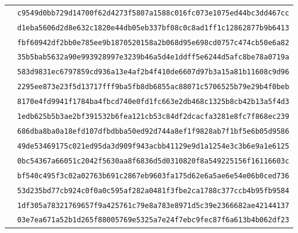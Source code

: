 {\begin{longtable}{L{0.36\textwidth}L{0.58\textwidth}}
 & \texttt{c9549d0bb729d14700f62d4273f5807a}\allowbreak\texttt{1588c016fc073e1075ed44bc3dd467cc}\\
 & \texttt{d1eba5606d2d8e632c1820e44db05eb3}\allowbreak\texttt{37bf08c0c8ad1ff1c12862877b9b6413}\\
 & \texttt{fbf60942df2bb0e785ee9b1870520158}\allowbreak\texttt{a2b068d95e698cd0757c474cb50e6a82}\\
 & \texttt{35b5bab5632a90e993928997e3239b46}\allowbreak\texttt{a5d4e1ddff5e6244d5afc8be78a0719a}\\
 & \texttt{583d9831ec6797859cd936a13e4af2b4}\allowbreak\texttt{f410de6607d97b3a15a81b11608c9d96}\\
 & \texttt{2295ee873e23f5d13717fff9ba5fb8db}\allowbreak\texttt{6855ac88071c5706525b79e29b4f0beb}\\
 & \texttt{8170e4fd9941f1784ba4fbcd740e0fd1}\allowbreak\texttt{fc663e2db468c1325b8cb42b13a5f4d3}\\
 & \texttt{1edb625b5b3ae2bf391532b6fea121cb}\allowbreak\texttt{53c84df2dcacfa3281e8fc7f868ec239}\\
 & \texttt{686dba8ba0a18efd107dfbdbba50ed92}\allowbreak\texttt{d744a8ef1f9828ab7f1bf5e6b05d9586}\\
 & \texttt{49de53469175c021ed95da3d909f943a}\allowbreak\texttt{cbb41129e9d1a1254e3c3b6e9a1e6125}\\
 & \texttt{0bc54367a66051c2042f5630aa8f6836}\allowbreak\texttt{d5d0310820f8a549225156f16116603c}\\
 & \texttt{bf540c495f3c02a02763b691c2867eb9}\allowbreak\texttt{603fa175d62e6a5ae6e54e06b0ced736}\\
 & \texttt{53d235bd77cb924c0f0a0c595af282a0}\allowbreak\texttt{481f3fbe2ca1788c377ccb4b95fb9584}\\
 & \texttt{1df305a78321769657f9a425761c79e8}\allowbreak\texttt{a783e8971d5c39e2366682ae42144137}\\
 & \texttt{03e7ea671a52b1d265f88005769e5325}\allowbreak\texttt{a7e24f7ebc9fec87f6a613b4b062df23}\\

\end{longtable}}
